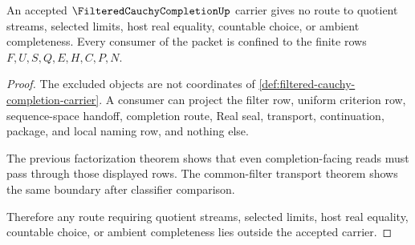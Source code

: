 \begin{theorem}\label{thm:filtered-cauchy-completion-nonescape}
An accepted $\FilteredCauchyCompletionUp$ carrier gives no route to quotient
streams, selected limits, host real equality, countable choice, or ambient
completeness. Every consumer of the packet is confined to the finite rows
$F,U,S,Q,E,H,C,P,N$.
\end{theorem}
\begin{proof}
The excluded objects are not coordinates of
\autoref{def:filtered-cauchy-completion-carrier}. A consumer can project the
filter row, uniform criterion row, sequence-space handoff, completion route,
Real seal, transport, continuation, package, and local naming row, and nothing
else.

The previous factorization theorem shows that even completion-facing reads
must pass through those displayed rows. The common-filter transport theorem
shows the same boundary after classifier comparison.

Therefore any route requiring quotient streams, selected limits, host real
equality, countable choice, or ambient completeness lies outside the accepted
carrier.
\end{proof}

\begin{closurestatus}{\FilteredCauchyCompletionUp}
  \theoryclosure{\seedClosure}
  \formalstatus{\unformalizedV}
\end{closurestatus}
